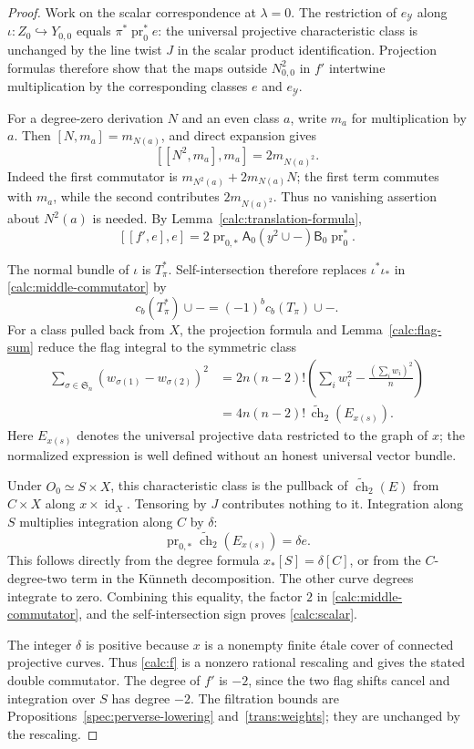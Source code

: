 \begin{proof}
Work on the scalar correspondence at $\lambda=0$.  The restriction of
$e_{\mathcal Y}$ along $\iota:Z_0\hookrightarrow Y_{0,0}$ equals
$\pi^*\operatorname{pr}_0^*e$: the universal projective characteristic
class is unchanged by the line twist $J$ in the scalar product
identification.  Projection formulas therefore show that the maps outside
$N_{0,0}^2$ in $f'$ intertwine multiplication by the corresponding classes
$e$ and $e_{\mathcal Y}$.

For a degree-zero derivation $N$ and an even class $a$, write $m_a$ for
multiplication by $a$.  Then $[N,m_a]=m_{N(a)}$, and direct expansion gives
\[
 [[N^2,m_a],m_a]=2m_{N(a)^2}.
\]
Indeed the first commutator is
$m_{N^2(a)}+2m_{N(a)}N$; the first term commutes with $m_a$, while the
second contributes $2m_{N(a)^2}$.  Thus no vanishing assertion about
$N^2(a)$ is needed.  By Lemma~\ref{calc:translation-formula},
\begin{equation}\label{calc:middle-commutator}
 [[f',e],e]
 =2\operatorname{pr}_{0,*}\mathsf A_0
       (y^2\cup-)\mathsf B_0\operatorname{pr}_0^*.
\end{equation}

The normal bundle of $\iota$ is $T_\pi^*$.  Self-intersection therefore
replaces $\iota^*\iota_*$ in \eqref{calc:middle-commutator} by
\[
 c_b(T_\pi^*)\cup-=(-1)^b c_b(T_\pi)\cup-.
\]
For a class pulled back from $X$, the projection formula and
Lemma~\ref{calc:flag-sum} reduce the flag integral to the symmetric class
\[
 \begin{split}
 \sum_{\sigma\in\mathfrak S_n}
     (w_{\sigma(1)}-w_{\sigma(2)})^2
 &=2n(n-2)!
    \left(\sum_iw_i^2-\frac{(\sum_iw_i)^2}{n}\right)\\
 &=4n(n-2)!\,\widetilde{\operatorname{ch}}_2(E_{x(s)}).
 \end{split}
\]
Here $E_{x(s)}$ denotes the universal projective data restricted to the
graph of $x$; the normalized expression is well defined without an honest
universal vector bundle.

Under $O_0\simeq S\times X$, this characteristic class is the pullback of
$\widetilde{\operatorname{ch}}_2(E)$ from $C\times X$ along
$x\times\operatorname{id}_X$.  Tensoring by $J$ contributes nothing to it.
Integration along $S$ multiplies integration along $C$ by $\delta$:
\[
 \operatorname{pr}_{0,*}
      \widetilde{\operatorname{ch}}_2(E_{x(s)})=\delta e.
\]
This follows directly from the degree formula $x_*[S]=\delta[C]$, or from
the $C$-degree-two term in the K\"unneth decomposition.  The other curve
degrees integrate to zero.
Combining this equality, the factor $2$ in
\eqref{calc:middle-commutator}, and the self-intersection sign proves
\eqref{calc:scalar}.

The integer $\delta$ is positive because $x$ is a nonempty finite
\'{e}tale cover of connected projective curves.  Thus
\eqref{calc:f} is a nonzero rational rescaling and gives the stated double
commutator.  The degree of $f'$ is $-2$, since the two flag shifts cancel
and integration over $S$ has degree $-2$.  The filtration bounds are
Propositions~\ref{spec:perverse-lowering} and~\ref{trans:weights}; they are unchanged by the rescaling.
\end{proof}

